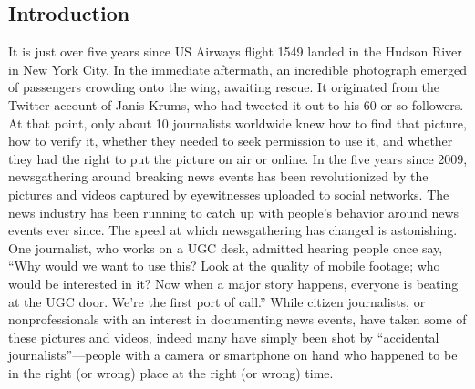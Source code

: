 \begin{enumerate}
\chapter{Introduction}
It is just over five years since US Airways flight 1549 landed in the Hudson
River in New York City. In the immediate aftermath, an incredible photograph
emerged of passengers crowding onto the wing, awaiting rescue. It
originated from the Twitter account of Janis Krums, who had tweeted it out
to his 60 or so followers. At that point, only about 10 journalists worldwide
knew how to find that picture, how to verify it, whether they needed to seek
permission to use it, and whether they had the right to put the picture on
air or online. In the five years since 2009, newsgathering around breaking
news events has been revolutionized by the pictures and videos captured
by eyewitnesses uploaded to social networks. The news industry has been
running to catch up with people's behavior around news events ever since.
The speed at which newsgathering has changed is astonishing. One journalist,
who works on a UGC desk, admitted hearing people once say, ``Why
would we want to use this? Look at the quality of mobile footage; who would
be interested in it? Now when a major story happens, everyone is beating at
the UGC door. We're the first port of call.''
While citizen journalists, or nonprofessionals with an interest in documenting news events, have taken some of these pictures and videos, indeed many have simply been shot by ``accidental journalists''—people with a camera or smartphone on hand who happened to be in the right (or wrong) place at the right (or wrong) time.


\end{enumerate}
